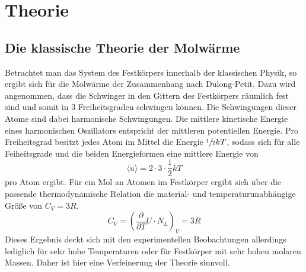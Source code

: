 \section{Theorie}
\label{sec:theorie}
%
\subsection{Die klassische Theorie der Molwärme}
%
Betrachtet man das System des Festkörpers innerhalb der klassischen Physik, so ergibt sich für die Molwärme der Zusammenhang nach Dulong-Petit. Dazu wird angenommen, dass die Schwinger in den Gittern des Festkörpers räumlich fest sind und somit in 3 Freiheitsgraden schwingen können. Die Schwingungen dieser Atome sind dabei harmonische Schwingungen. Die mittlere kinetische Energie eines harmonischen Oszillators entspricht der mittleren potentiellen Energie. Pro Freiheitsgrad besitzt jedes Atom im Mittel die Energie $\sfrac{1}{2}kT$, sodass sich für alle Feiheitsgrade und die beiden Energieformen eine mittlere Energie von
%
\begin{equation}
  \langle u\rangle=2\cdot 3\cdot\frac{1}{2}kT
\end{equation}
%
pro Atom ergibt. Für ein Mol an Atomen im Festkörper ergibt sich über die passende thermodynamische Relation die material- und temperaturunabhängige Größe von $C_V=3R$.
%
\begin{equation}
  C_V=\left(\frac{\partial}{\partial T}U\cdot N_L\right)_V=3R
  \label{eq:CV}
\end{equation}
%
Dieses Ergebnis deckt sich mit den experimentellen Beobachtungen allerdings lediglich für sehr hohe Temperaturen oder für Festkörper mit sehr hohen molaren Massen. Daher ist hier eine Verfeinerung der Theorie sinnvoll.
%
